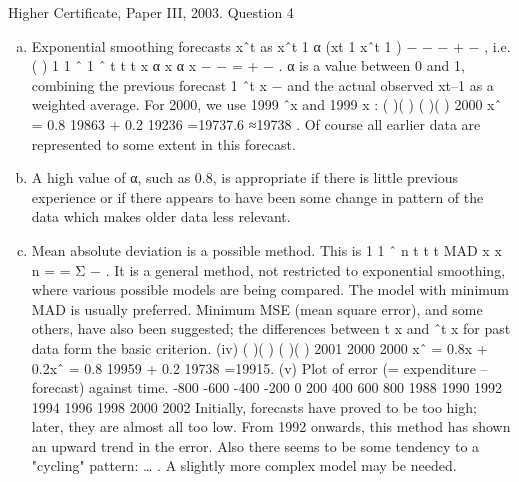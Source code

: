 \documentclass[a4paper,12pt]{article}
\begin{document}
Higher Certificate, Paper III, 2003. Question 4
\begin{enumerate}[(a)]
\item  Exponential smoothing forecasts xˆt as xˆt 1 α (xt 1 xˆt 1 ) − − − + − , i.e.
( ) 1 1 ˆ 1 ˆ t t t x α x α x − − = + − .
α is a value between 0 and 1, combining the previous forecast 1 ˆt x − and the actual
observed xt–1 as a weighted average.
For 2000, we use 1999 ˆx and 1999 x :
( )( ) ( )( ) 2000 xˆ = 0.8 19863 + 0.2 19236 =19737.6 ≈19738 .
Of course all earlier data are represented to some extent in this forecast.
\item A high value of α, such as 0.8, is appropriate if there is little previous
experience or if there appears to have been some change in pattern of the data which
makes older data less relevant.
\item Mean absolute deviation is a possible method. This is
1
1 ˆ
n
t t
t
MAD x x
n =
= Σ − .
It is a general method, not restricted to exponential smoothing, where various possible
models are being compared. The model with minimum MAD is usually preferred.
Minimum MSE (mean square error), and some others, have also been suggested; the
differences between t x and ˆt x for past data form the basic criterion.
(iv) ( )( ) ( )( ) 2001 2000 2000 xˆ = 0.8x + 0.2xˆ = 0.8 19959 + 0.2 19738 =19915.
(v) Plot of error (= expenditure – forecast) against time.
-800
-600
-400
-200
0
200
400
600
800
1988 1990 1992 1994 1996 1998 2000 2002
Initially, forecasts have proved to be too high; later, they are almost all too low.
From 1992 onwards, this method has shown an upward trend in the error. Also there
seems to be some tendency to a "cycling" pattern: … . A slightly
more complex model may be needed.
\end{enumerate}
\end{document}
